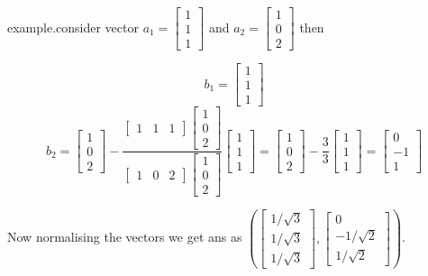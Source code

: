 \documentclass[a4paper,11pt]{article}
\numberwithin{equation}{section}
\begin{document}
\begin{itemize}
example.consider vector $a_1=\begin{bmatrix}1\\1\\1\end{bmatrix}$ and $a_2=\begin{bmatrix}1\\0\\2\end{bmatrix}$ then 
\begin{center}
    \[b_1=
    \begin{bmatrix}
        1\\1\\1
    \end{bmatrix}
    \]
    \[b_2=
    \begin{bmatrix}
        1\\0\\2
    \end{bmatrix}-
    \frac{\begin{bmatrix}
        1&1&1
    \end{bmatrix}
    \begin{bmatrix}
        1\\0\\2
    \end{bmatrix}}{\begin{bmatrix}
        1&0&2
    \end{bmatrix}
    \begin{bmatrix}
        1\\0\\2
    \end{bmatrix}}
    \begin{bmatrix}
        1\\1\\1
    \end{bmatrix}=
    \begin{bmatrix}
        1\\0\\2
    \end{bmatrix}-\frac{3}{3}
    \begin{bmatrix}
    1\\1\\1        
    \end{bmatrix}=\begin{bmatrix}
        0\\-1\\1
    \end{bmatrix}
    \]
\end{center}
Now normalising the vectors we get ans as $\left(\begin{bmatrix}
    1/\sqrt{3}\\1/\sqrt{3}\\1/\sqrt{3}
\end{bmatrix},\begin{bmatrix}
    0\\-1/\sqrt{2}\\1/\sqrt{2}
\end{bmatrix}\right)$.\\


\end{itemize}
\end{document}
